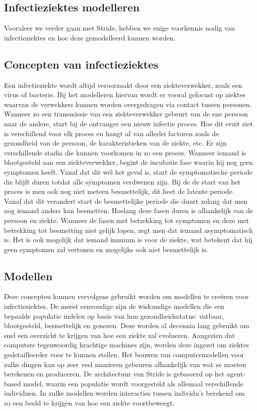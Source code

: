 \begin{appendices}
\section{Infectieziektes modelleren}
Vooraleer we verder gaan met Stride, hebben we enige voorkennis nodig van infectieziektes en hoe deze gemodelleerd kunnen worden.

\subsection{Concepten van infectieziektes}
Een infectieziekte wordt altijd veroorzaakt door een ziekteverwekker, zoals een virus of bacterie. Bij het modelleren hiervan wordt er vooral gefocust op ziektes waarvan de verwekkers kunnen worden overgedragen via contact tussen personen. Wanneer zo een transmissie van een ziekteverwekker gebeurt van de ene persoon naar de andere, start bij de ontvanger een nieuw infectie proces. Hoe dit eruit ziet is verschillend voor elk proces en hangt af van allerlei factoren zoals de gezondheid van de persoon, de karakteristieken van de ziekte, etc. Er zijn verschillende stadia die kunnen voorkomen in zo een proces. Wanneer iemand is blootgesteld aan een ziekteverwekker, begint de incubatie fase waarin hij nog geen symptomen heeft. Vanaf dat dit wél het geval is, start de symptomatische periode die blijft duren totdat alle symptomen verdwenen zijn. Bij de de start van het proces is men ook nog niet meteen besmettelijk, dit heet de latente periode. Vanaf dat dit verandert start de besmettelijke periode die duurt zolang dat men nog iemand anders kan besmetten. Hoelang deze fasen duren is afhankelijk van de persoon en ziekte. Wanneer de fasen met betrekking tot symptomen en deze met betrekking tot besmetting niet gelijk lopen, zegt men dat iemand asymptomatisch is. Het is ook mogelijk dat iemand immuun is voor de ziekte, wat betekent dat hij geen symptomen zal vertonen en mogelijks ook niet besmettelijk is.

\subsection{Modellen}
Deze concepten kunnen vervolgens gebruikt worden om modellen te creëren voor infectieziektes. De meest eenvoudige zijn de wiskundige modellen die een bepaalde populatie indelen op basis van hun gezondheidsstatus: vatbaar, blootgesteld, besmettelijk en genezen. Deze worden al decennia lang gebruikt om snel een overzicht te krijgen van hoe een ziekte zal evolueren. Aangezien dat computers tegenwoordig krachtige machines zijn, worden deze ingezet om ziektes gedetailleerder voor te kunnen stellen. Het bouwen van computermodellen voor zulke dingen kan op zeer veel manieren gebeuren afhankelijk van wat ze moeten berekenen en produceren. De architectuur van Stride is gebaseerd op het agent-based model, waarin een populatie wordt voorgesteld als allemaal verschillende individuen. In zulke modellen worden interacties tussen individu's berekend om zo een beeld te krijgen van hoe een ziekte voortbeweegt.


\end{appendices}
